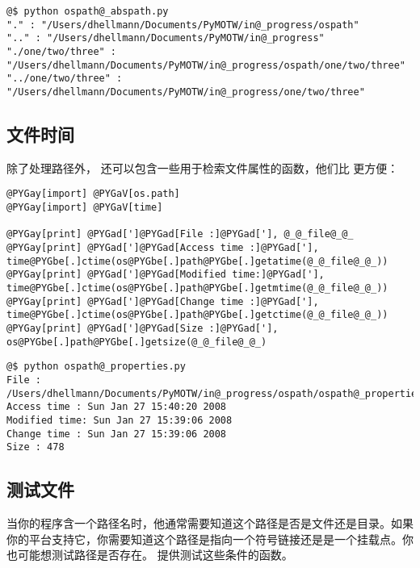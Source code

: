 \documentclass[a4paper,10pt,english]{manual}
\begin{document}
\begin{Verbatim}[commandchars=@\[\]]
@$ python ospath@_abspath.py
"." : "/Users/dhellmann/Documents/PyMOTW/in@_progress/ospath"
".." : "/Users/dhellmann/Documents/PyMOTW/in@_progress"
"./one/two/three" : "/Users/dhellmann/Documents/PyMOTW/in@_progress/ospath/one/two/three"
"../one/two/three" : "/Users/dhellmann/Documents/PyMOTW/in@_progress/one/two/three"
\end{Verbatim}


\subsection{文件时间}

除了处理路径外，  还可以包含一些用于检索文件属性的函数，他们比  更方便：

\begin{Verbatim}[commandchars=@\[\]]
@PYGay[import] @PYGaV[os.path]
@PYGay[import] @PYGaV[time]

@PYGay[print] @PYGad[']@PYGad[File :]@PYGad['], @_@_file@_@_
@PYGay[print] @PYGad[']@PYGad[Access time :]@PYGad['], time@PYGbe[.]ctime(os@PYGbe[.]path@PYGbe[.]getatime(@_@_file@_@_))
@PYGay[print] @PYGad[']@PYGad[Modified time:]@PYGad['], time@PYGbe[.]ctime(os@PYGbe[.]path@PYGbe[.]getmtime(@_@_file@_@_))
@PYGay[print] @PYGad[']@PYGad[Change time :]@PYGad['], time@PYGbe[.]ctime(os@PYGbe[.]path@PYGbe[.]getctime(@_@_file@_@_))
@PYGay[print] @PYGad[']@PYGad[Size :]@PYGad['], os@PYGbe[.]path@PYGbe[.]getsize(@_@_file@_@_)
\end{Verbatim}

\begin{Verbatim}[commandchars=@\[\]]
@$ python ospath@_properties.py
File : /Users/dhellmann/Documents/PyMOTW/in@_progress/ospath/ospath@_properties.py
Access time : Sun Jan 27 15:40:20 2008
Modified time: Sun Jan 27 15:39:06 2008
Change time : Sun Jan 27 15:39:06 2008
Size : 478
\end{Verbatim}


\subsection{测试文件}

当你的程序含一个路径名时，他通常需要知道这个路径是否是文件还是目录。如果你的平台支持它，你需要知道这个路径是指向一个符号链接还是是一个挂载点。你也可能想测试路径是否存在。  提供测试这些条件的函数。
\end{document}
